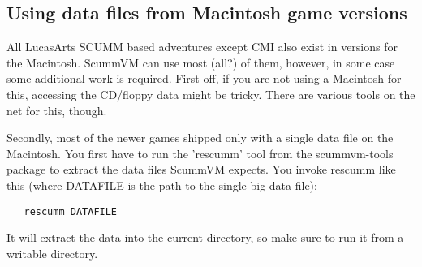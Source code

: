 \subsection {Using data files from Macintosh game versions}
All LucasArts SCUMM based adventures except CMI also exist in versions for the
Macintosh. ScummVM can use most (all?) of them, however, in some case some
additional work is required. First off, if you are not using a Macintosh for
this, accessing the CD/floppy data might be tricky. There are various tools on
the net for this, though.

Secondly, most of the newer games shipped only with a  single data file on the
Macintosh. You first have to run the 'rescumm' tool from the scummvm-tools
package to extract the data files ScummVM expects. You invoke rescumm like
this (where DATAFILE is the path to the single big data file):
\begin{verbatim}
   rescumm DATAFILE
\end{verbatim}
It will extract the data into the current directory, so make sure to
run it from a writable directory.
